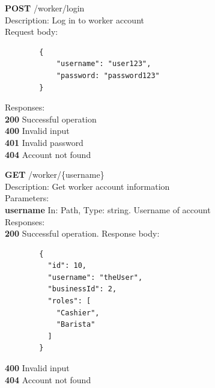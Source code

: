 \documentclass[11pt,a4paper,pdftex]{article}
\begin{document}
\hspace*{1em}\textbf{POST} /worker/login\\
\hspace*{2em}Description: Log in to worker account\\
\hspace*{2em}Request body:
\begin{verbatim}
        {
            "username": "user123",
            "password: "password123"
        }
\end{verbatim}
\hspace*{2em}Responses:\\
\hspace*{3em}\textbf{200} Successful operation\\
\hspace*{3em}\textbf{400} Invalid input\\
\hspace*{3em}\textbf{401} Invalid password\\
\hspace*{3em}\textbf{404} Account not found

\hspace*{1em}\textbf{GET} /worker/\{username\}\\
\hspace*{2em}Description: Get worker account information\\
\hspace*{2em}Parameters:\\
\hspace*{3em}\textbf{username} In: Path, Type: string. Username of account\\
\hspace*{2em}Responses:\\
\hspace*{3em}\textbf{200} Successful operation. Response body:
\begin{verbatim}
        {
          "id": 10,
          "username": "theUser",
          "businessId": 2,
          "roles": [
            "Cashier",
            "Barista"
          ]
        }
\end{verbatim}
\hspace*{3em}\textbf{400} Invalid input\\
\hspace*{3em}\textbf{404} Account not found
\end{document}
